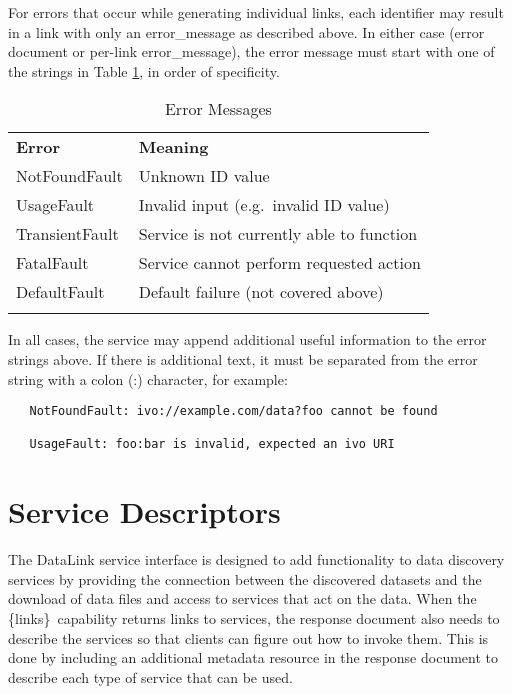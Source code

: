 \documentclass[11pt,a4paper]{ivoa}
\newcommand{\blinks}{\{links\}}
\begin{document}
For errors that occur while generating individual links, each
identifier may result in a link with only an error\_message
as described above.
In either case (error document or per-link error\_message),
the error message must start with one of the strings in
Table \ref{tab:errors}, in order of specificity.
\begin{table}[ht]
\begin{center}
\begin{tabular}{|l|l|}
\sptablerule
{\bf Error} & {\bf Meaning} \\
\sptablerule
NotFoundFault  & Unknown ID value    \\
UsageFault     & Invalid input (e.g.\ invalid ID value) \\
TransientFault & Service is not currently able to function \\
FatalFault     & Service cannot perform requested action \\
DefaultFault   & Default failure (not covered above) \\
\sptablerule
\end{tabular}
\end{center}
\caption{Error Messages}
\label{tab:errors}
\end{table}

In all cases, the service may append additional useful information to the
error strings above.
If there is additional text, it must be separated
from the error string with a colon (:) character, for example:
\begin{verbatim}
   NotFoundFault: ivo://example.com/data?foo cannot be found

   UsageFault: foo:bar is invalid, expected an ivo URI 
\end{verbatim}


\section{Service Descriptors}
\label{sec:serviceDescriptors}

The DataLink service interface is designed to add functionality to data
discovery services by providing the connection between the discovered
datasets and the download of data files and access to services that act
on the data. When the \blinks\ capability returns links to services, the
response document also needs to describe the services so that clients can
figure out how to invoke them. This is done by including an additional
metadata resource in the response document to describe each type of
service that can be used.
\end{document}

